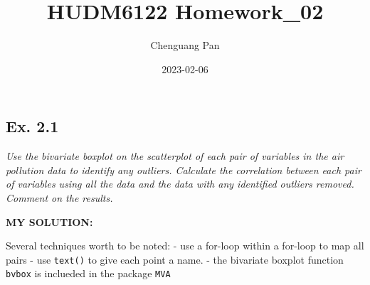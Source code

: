 \documentclass[
]{article}
\title{HUDM6122 Homework\_02}
\author{Chenguang Pan}
\date{2023-02-06}
\begin{document}
\maketitle

\hypertarget{ex.-2.1}{%
\subsection{Ex. 2.1}\label{ex.-2.1}}

\emph{Use the bivariate boxplot on the scatterplot of each pair of
variables in the air pollution data to identify any outliers. Calculate
the correlation between each pair of variables using all the data and
the data with any identified outliers removed. Comment on the results.}

\textbf{MY SOLUTION:}

Several techniques worth to be noted: - use a for-loop within a for-loop
to map all pairs - use \texttt{text()} to give each point a name. - the
bivariate boxplot function \texttt{bvbox} is inclueded in the package
\texttt{MVA}
\end{document}
